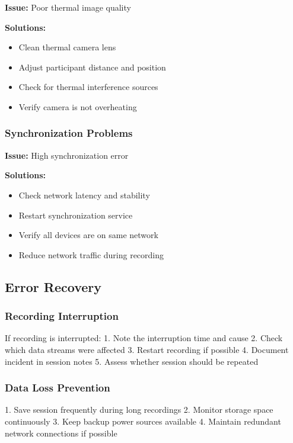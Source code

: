\textbf{Issue:} Poor thermal image quality

\textbf{Solutions:}
\begin{itemize}
\item Clean thermal camera lens
\item Adjust participant distance and position
\item Check for thermal interference sources
\item Verify camera is not overheating
\end{itemize}

\subsubsection{Synchronization Problems}

\textbf{Issue:} High synchronization error

\textbf{Solutions:}
\begin{itemize}
\item Check network latency and stability
\item Restart synchronization service
\item Verify all devices are on same network
\item Reduce network traffic during recording
\end{itemize}

\subsection{Error Recovery}

\subsubsection{Recording Interruption}

If recording is interrupted:
1. Note the interruption time and cause
2. Check which data streams were affected
3. Restart recording if possible
4. Document incident in session notes
5. Assess whether session should be repeated

\subsubsection{Data Loss Prevention}

1. Save session frequently during long recordings
2. Monitor storage space continuously
3. Keep backup power sources available
4. Maintain redundant network connections if possible

